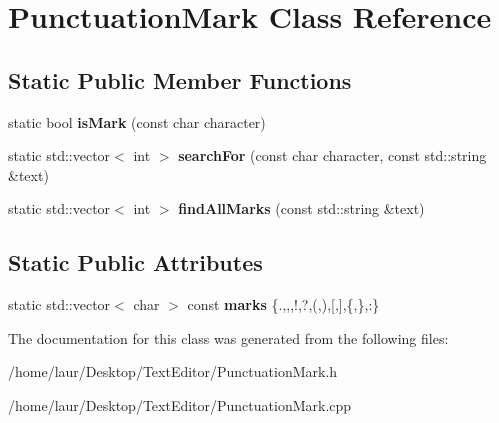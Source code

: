 \hypertarget{class_punctuation_mark}{}\section{Punctuation\+Mark Class Reference}
\label{class_punctuation_mark}
\subsection*{Static Public Member Functions}
\begin{DoxyCompactItemize}
\item 
\mbox{\label{class_punctuation_mark_ab46bc081295e69d79097344be31fa4bc}} 
static bool {\bfseries is\+Mark} (const char character)
\item 
\mbox{\label{class_punctuation_mark_ac1f9081cafe0c3290a32da66bddff6b9}} 
static std\+::vector$<$ int $>$ {\bfseries search\+For} (const char character, const std\+::string \&text)
\item 
\mbox{\label{class_punctuation_mark_aef43138e26ce10d11728047f46c78fde}} 
static std\+::vector$<$ int $>$ {\bfseries find\+All\+Marks} (const std\+::string \&text)
\end{DoxyCompactItemize}
\subsection*{Static Public Attributes}
\begin{DoxyCompactItemize}
\item 
\mbox{\label{class_punctuation_mark_a4c6e2bf50dfbfdb36e6c3051b740c468}} 
static std\+::vector$<$ char $>$ const {\bfseries marks} \{\textquotesingle{}.\textquotesingle{},\textquotesingle{},\textquotesingle{},\textquotesingle{}!\textquotesingle{},\textquotesingle{}?\textquotesingle{},\textquotesingle{}(\textquotesingle{},\textquotesingle{})\textquotesingle{},\textquotesingle{}\mbox{[}\textquotesingle{},\textquotesingle{}\mbox{]}\textquotesingle{},\textquotesingle{}\{\textquotesingle{},\textquotesingle{}\}\textquotesingle{},\textquotesingle{}\+:\textquotesingle{}\}
\end{DoxyCompactItemize}


The documentation for this class was generated from the following files\+:\begin{DoxyCompactItemize}
\item 
/home/laur/\+Desktop/\+Text\+Editor/Punctuation\+Mark.\+h\item 
/home/laur/\+Desktop/\+Text\+Editor/Punctuation\+Mark.\+cpp\end{DoxyCompactItemize}
